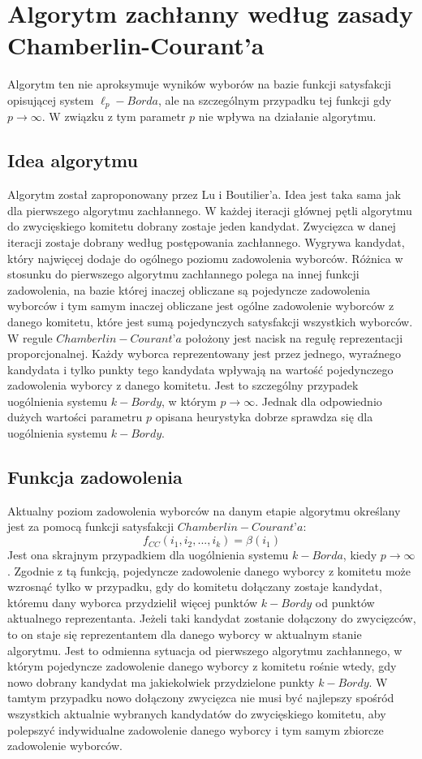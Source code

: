 \documentclass[pdflatex,11pt]{../aghdoc_version2}
\begin{document}
\section{Algorytm zachłanny według zasady Chamberlin-Courant’a}
Algorytm ten nie aproksymuje wyników wyborów na bazie funkcji satysfakcji opisującej
system $\ell_p-Borda$, ale na szczególnym przypadku tej funkcji gdy $p \to \infty$. W związku z tym parametr $p$ nie wpływa na działanie algorytmu.

\subsection{Idea algorytmu}
Algorytm został zaproponowany przez Lu i Boutilier’a. Idea jest taka sama jak dla
pierwszego algorytmu zachłannego. W każdej iteracji głównej pętli algorytmu do
zwycięskiego komitetu dobrany zostaje jeden kandydat. Zwycięzca w danej iteracji zostaje
dobrany według postępowania zachłannego. Wygrywa kandydat, który najwięcej dodaje do
ogólnego poziomu zadowolenia wyborców. Różnica w stosunku do pierwszego algorytmu
zachłannego polega na innej funkcji zadowolenia, na bazie której inaczej obliczane są
pojedyncze zadowolenia wyborców i tym samym inaczej obliczane jest ogólne zadowolenie
wyborców z danego komitetu, które jest sumą pojedynczych satysfakcji wszystkich
wyborców. W regule $Chamberlin-Courant’a$ położony jest nacisk na regułę reprezentacji proporcjonalnej. Każdy wyborca reprezentowany jest przez jednego, wyraźnego kandydata i
tylko punkty tego kandydata wpływają na wartość pojedynczego zadowolenia wyborcy z
danego komitetu. Jest to szczególny przypadek uogólnienia systemu $k-Bordy$, w którym $p \to \infty$. Jednak dla odpowiednio dużych wartości parametru $p$ opisana heurystyka dobrze
sprawdza się dla uogólnienia systemu $k-Bordy$.

\subsection{Funkcja zadowolenia}
Aktualny poziom zadowolenia wyborców na danym etapie algorytmu określany jest za
pomocą funkcji satysfakcji $Chamberlin-Courant’a$: $$f_{CC}(i_1, i_2, ..., i_k) = \beta(i_1) $$ Jest ona skrajnym przypadkiem dla uogólnienia systemu $k-Borda$, kiedy $p \to \infty$. Zgodnie z tą
funkcją, pojedyncze zadowolenie danego wyborcy z komitetu może wzrosnąć tylko w
przypadku, gdy do komitetu dołączany zostaje kandydat, któremu dany wyborca przydzielił
więcej punktów $k-Bordy$ od punktów aktualnego reprezentanta. Jeżeli taki kandydat zostanie
dołączony do zwycięzców, to on staje się reprezentantem dla danego wyborcy w aktualnym
stanie algorytmu. Jest to odmienna sytuacja od pierwszego algorytmu zachłannego, w
którym pojedyncze zadowolenie danego wyborcy z komitetu rośnie wtedy, gdy nowo
dobrany kandydat ma jakiekolwiek przydzielone punkty $k-Bordy$. W tamtym przypadku nowo
dołączony zwycięzca nie musi być najlepszy spośród wszystkich aktualnie wybranych
kandydatów do zwycięskiego komitetu, aby polepszyć indywidualne zadowolenie danego
wyborcy i tym samym zbiorcze zadowolenie wyborców.
\end{document}

